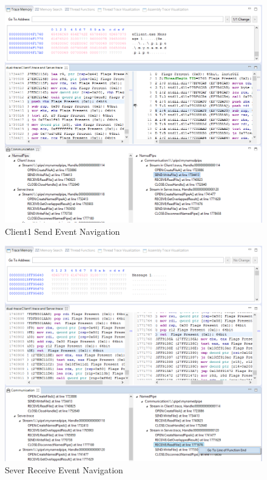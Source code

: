 \begin{figure}[H]
\centerline{\includegraphics[scale=0.4]{Figures/result21_client_send}}
 \caption{Client1 Send Event Navigation}
\label{result21_client1_send}
\end{figure}

\begin{figure}[H]
\centerline{\includegraphics[scale=0.4]{Figures/result21_server_read}}
 \caption{Sever Receive Event Navigation}
\label{result21_server_read}
\end{figure}

